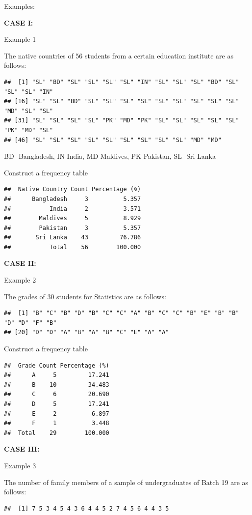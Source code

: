\documentclass[]{book}
\begin{document}
Examples:

\textbf{CASE I:}

Example 1

The native countries of 56 students from a certain education institute are as follows:

\begin{verbatim}
##  [1] "SL" "BD" "SL" "SL" "SL" "SL" "IN" "SL" "SL" "SL" "BD" "SL" "SL" "SL" "IN"
## [16] "SL" "SL" "BD" "SL" "SL" "SL" "SL" "SL" "SL" "SL" "SL" "SL" "MD" "SL" "SL"
## [31] "SL" "SL" "SL" "SL" "PK" "MD" "PK" "SL" "SL" "SL" "SL" "SL" "PK" "MD" "SL"
## [46] "SL" "SL" "SL" "SL" "SL" "SL" "SL" "SL" "SL" "MD" "MD"
\end{verbatim}

BD- Bangladesh, IN-India, MD-Maldives, PK-Pakistan, SL- Sri Lanka

Construct a frequency table

\begin{verbatim}
##  Native Country Count Percentage (%)
##      Bangladesh     3          5.357
##           India     2          3.571
##        Maldives     5          8.929
##        Pakistan     3          5.357
##       Sri Lanka    43         76.786
##           Total    56        100.000
\end{verbatim}

\textbf{CASE II:}

Example 2

The grades of 30 students for Statistics are as follows:

\begin{verbatim}
##  [1] "B" "C" "B" "D" "B" "C" "C" "A" "B" "C" "C" "B" "E" "B" "B" "D" "D" "F" "B"
## [20] "D" "D" "A" "B" "A" "B" "C" "E" "A" "A"
\end{verbatim}

Construct a frequency table

\begin{verbatim}
##  Grade Count Percentage (%)
##      A     5         17.241
##      B    10         34.483
##      C     6         20.690
##      D     5         17.241
##      E     2          6.897
##      F     1          3.448
##  Total    29        100.000
\end{verbatim}

\textbf{CASE III:}

Example 3

The number of family members of a sample of undergraduates of Batch 19 are as follows:

\begin{verbatim}
##  [1] 7 5 3 4 5 4 3 6 4 4 5 2 7 4 5 6 4 4 3 5
\end{verbatim}
\end{document}
